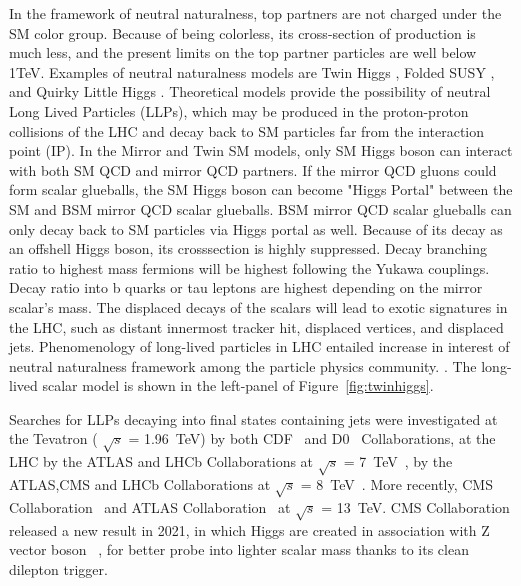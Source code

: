 In the framework of neutral naturalness, top partners are not charged under the SM color group. 
Because of being colorless, its cross-section of production is much less, and the present limits on the top partner particles are well below 1TeV. 
Examples of neutral naturalness models are Twin Higgs \cite{Chacko:2005pe},
Folded SUSY \cite{Burdman:2006tz}, and Quirky Little Higgs \cite{Cai:2008au}.
Theoretical models provide the possibility of neutral Long Lived Particles (LLPs), which may be produced in the proton-proton
collisions of the LHC and decay back to SM particles far from the interaction point (IP).\cite{Craig:2015pha}
In the Mirror and Twin SM models, only SM Higgs boson can interact with both SM QCD and mirror QCD partners.
If the mirror QCD gluons could form scalar glueballs, the SM Higgs boson can become "Higgs Portal" between the SM and BSM mirror QCD scalar glueballs. 
BSM mirror QCD scalar glueballs can only decay back to SM particles via Higgs portal as well. 
Because of its decay as an offshell Higgs boson, its crosssection is highly suppressed. 
Decay branching ratio to highest mass fermions will be highest following the Yukawa couplings.
Decay ratio into b quarks or tau leptons are highest depending on the mirror scalar's mass.
The displaced decays of the scalars will lead to exotic signatures in the LHC, such as distant innermost tracker hit, displaced vertices, and displaced jets.
Phenomenology of long-lived particles in LHC entailed increase in interest of neutral naturalness framework among the particle physics community. \cite{Curtin:2015fna,Csaki:2015fba}.
The long-lived scalar model is shown in the left-panel of Figure~\ref{fig:twinhiggs}.


Searches for LLPs decaying into final states containing jets were investigated
at the Tevatron ( $\sqrt{s}$ = 1.96~TeV) by both CDF~\cite{Aaltonen:2011rja} and D0~\cite{Abazov:2009ik} Collaborations,
at the LHC by the ATLAS and LHCb Collaborations at $\sqrt{s}$ = 7~TeV~\cite{ATLAS:2012av,Aaij:2014nma},
by the ATLAS,CMS and LHCb Collaborations at $\sqrt{s}$ = 8~TeV~\cite{Aad:2015uaa,Aad:2015rba,PhysRevD.91.012007,Aad:2015asa,Aaij:2017mic,Aaij:2016xmb,Aaij:2015ica}.
More recently, CMS Collaboration~\cite{Sirunyan:2017jdo,displacedvertices,displacedjets2016,delayedjets,emergingjets,CMS-PAS-EXO-19-021}
 and ATLAS Collaboration~\cite{Aaboud:2018iil,Aaboud:2018jbr,Aaboud:2018arf,Aaboud:2018aqj,Aaboud:2018kbe,Aaboud:2019trc,Aaboud:2019opc,Aad:2019kiz,Aad:2019pfm,Aad:2019tcc,Aad:2019xav,Aad:2019tua} at $\sqrt{s}$ = 13~TeV. 
CMS Collaboration released a new result in 2021, in which Higgs are created in association with Z vector boson ~\cite{ZHAN}, for better probe into lighter scalar mass thanks to its clean dilepton trigger.

